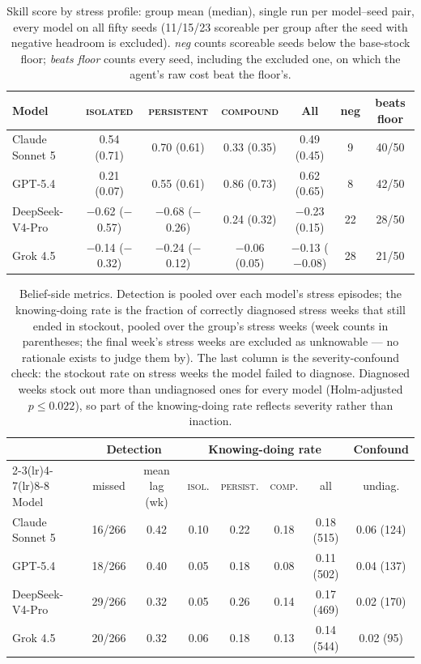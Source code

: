 \documentclass{article}
\begin{document}
\begin{table}[t]
  \caption{Skill score by stress profile: group mean (median), single run
  per model--seed pair, every model on all fifty seeds (11/15/23 scoreable
  per group after the seed with negative headroom is excluded). \emph{neg}
  counts scoreable seeds below the base-stock floor; \emph{beats floor}
  counts every seed, including the excluded one, on which the agent's raw
  cost beat the floor's.}
  \label{tab:skill}
  \centering
  \small
  \begin{tabular}{lcccccc}
    \toprule
    Model & \textsc{isolated} & \textsc{persistent} & \textsc{compound} & All & neg & beats floor \\
    \midrule
    Claude Sonnet 5 & 0.54 (0.71) & 0.70 (0.61) & 0.33 (0.35) & 0.49 (0.45) & 9 & 40/50 \\
    GPT-5.4         & 0.21 (0.07) & 0.55 (0.61) & 0.86 (0.73) & 0.62 (0.65) & 8 & 42/50 \\
    DeepSeek-V4-Pro & $-$0.62 ($-$0.57) & $-$0.68 ($-$0.26) & 0.24 (0.32) & $-$0.23 (0.15) & 22 & 28/50 \\
    Grok 4.5        & $-$0.14 ($-$0.32) & $-$0.24 ($-$0.12) & $-$0.06 (0.05) & $-$0.13 ($-$0.08) & 28 & 21/50 \\
    \bottomrule
  \end{tabular}
\end{table}

\begin{table}[t]
  \caption{Belief-side metrics. Detection is pooled over each model's
  stress episodes; the knowing-doing rate is the fraction of correctly
  diagnosed stress weeks that still ended in stockout, pooled over the
  group's stress weeks (week counts in parentheses; the final week's
  stress weeks are excluded as unknowable --- no rationale exists to
  judge them by). The last column is the severity-confound check: the
  stockout rate on stress weeks the model failed to diagnose. Diagnosed
  weeks stock out more than undiagnosed ones for every model
  (Holm-adjusted $p \le 0.022$), so part of the knowing-doing rate
  reflects severity rather than inaction.}
  \label{tab:belief}\label{tab:confound}
  \centering
  \small
  \begin{tabular}{lccccccc}
    \toprule
    & \multicolumn{2}{c}{Detection} & \multicolumn{4}{c}{Knowing-doing rate} & Confound \\
    \cmidrule(lr){2-3}\cmidrule(lr){4-7}\cmidrule(lr){8-8}
    Model & missed & mean lag (wk) & \textsc{isol.} & \textsc{persist.} & \textsc{comp.} & all & undiag. \\
    \midrule
    Claude Sonnet 5 & 16/266 & 0.42 & 0.10 & 0.22 & 0.18 & 0.18 (515) & 0.06 (124) \\
    GPT-5.4         & 18/266 & 0.40 & 0.05 & 0.18 & 0.08 & 0.11 (502) & 0.04 (137) \\
    DeepSeek-V4-Pro & 29/266 & 0.32 & 0.05 & 0.26 & 0.14 & 0.17 (469) & 0.02 (170) \\
    Grok 4.5        & 20/266 & 0.32 & 0.06 & 0.18 & 0.13 & 0.14 (544) & 0.02 (95) \\
    \bottomrule
  \end{tabular}
\end{table}
\end{document}
